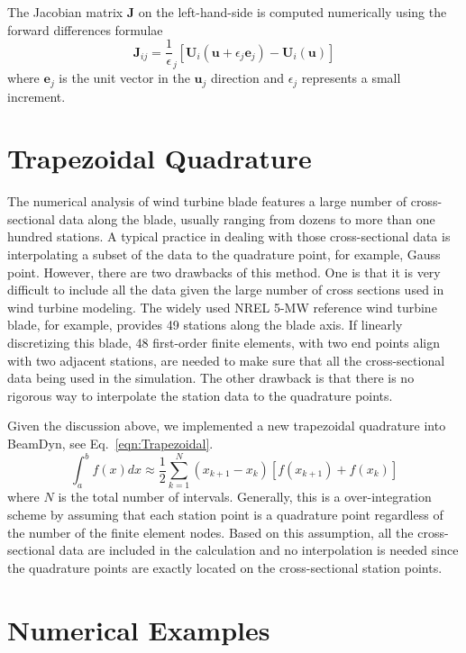 \documentclass{aiaa-tc}
\begin{document}
 The Jacobian matrix $\mathbf{J}$ on the left-hand-side is computed numerically using the forward differences formulae
 \begin{equation}
     \label{Jacobian}
     \mathbf{J}_{ij} = \frac{1}{\epsilon}_j \left[\mathbf{U}_i(\mathbf{u}+\epsilon_j \mathbf{e}_j) - \mathbf{U}_i(\mathbf{u}) \right]
 \end{equation}
 where $\mathbf{e}_j$ is the unit vector in the $\mathbf{u}_j$ direction and $\epsilon_j$ represents a small increment.
 
 \section{Trapezoidal Quadrature}
 The numerical analysis of wind turbine blade features a large number of cross-sectional data along the blade, usually ranging from dozens to more than one hundred stations. A typical practice in dealing with those cross-sectional data is interpolating a subset of the data to the quadrature point, for example, Gauss point. However, there are two drawbacks of this method. One is that it is very difficult to include all the data given the large number of cross sections used in wind turbine modeling. The widely used NREL 5-MW reference wind turbine blade, for example, provides 49 stations along the blade axis. If linearly discretizing this blade, 48 first-order finite elements, with two end points align with two adjacent stations, are needed to make sure that all the cross-sectional data being used in the simulation. The other drawback is that there is no rigorous way to interpolate the station data to the quadrature points. 
 
 Given the discussion above, we implemented a new trapezoidal quadrature into BeamDyn, see Eq.~\ref{eqn:Trapezoidal}.
 \begin{equation}
     \label{eqn:Trapezoidal}
     \int_a^b f(x) dx \approx \displaystyle \frac{1}{2} \sum_{k=1}^{N}(x_{k+1}-x_k)\left[f(x_{k+1}) + f(x_k)\right] 
 \end{equation}  
 where $N$ is the total number of intervals. Generally, this is a over-integration scheme by assuming that each station point is a quadrature point regardless of the number of the finite element nodes. Based on this assumption, all the cross-sectional data are included in the calculation and no interpolation is needed since the quadrature points are exactly located on the cross-sectional station points. 
 
 \section{Numerical Examples}
 
\end{document}
